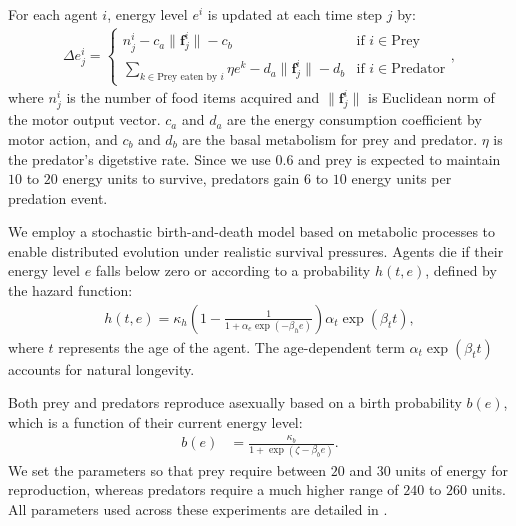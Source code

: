 \documentclass[dvipsnames,format=sigconf]{acmart}
\newcommand{\1}{\mathbb{I} } %
\newcounter{num}
\begin{document}
For each agent $i$, energy level $e^i$ is updated at each time step $j$ by:
\begin{align}
  \Delta{e}_{j}^i =
  \begin{cases}
    n_{j}^{i} - c_{a}\|\bm{f}_{j}^{i}\| - c_{b} & \text{if } i \in \text{Prey} \\
    \sum_{k \in \text{Prey eaten by }i} \eta e^k - d_{a}\|\bm{f}_{j}^{i}\| - d_{b} & \text{if } i \in \text{Predator}
  \end{cases},
  \label{eq:energy}
\end{align}
where $n_{j}^{i}$ is the number of food items acquired and $\|\bm{f}_{j}^{i}\|$ is Euclidean norm of the motor output vector. $c_a$ and $d_a$ are the energy consumption coefficient by motor action, and $c_b$ and $d_b$ are the basal metabolism for prey and predator. $\eta$ is the predator's digetstive rate. Since we use $0.6$ and prey is expected to maintain $10$ to $20$ energy units to survive, predators gain $6$ to $10$ energy units per predation event.

We employ a stochastic birth-and-death model based on metabolic processes to enable distributed evolution under realistic survival pressures. Agents die if their energy level $e$ falls below zero or according to a probability $h(t, e)$, defined by the hazard function:
\begin{align}
  h(t, e) = \kappa_{h}\left(1 - \frac{1}{1 + \alpha_{e}\exp(-\beta_{h}e)}\right)\alpha_{t} \exp(\beta_{t} t),
  \label{eq:h}
\end{align}
where $t$ represents the age of the agent. The age-dependent term $\alpha_{t} \exp(\beta_{t} t)$ accounts for natural longevity.

Both prey and predators reproduce asexually based on a birth probability $b(e)$, which is a function of their current energy level:
\begin{align}
 b(e) &= \frac{\kappa_{b}}{1 + \exp(\zeta - \beta_{b}e)}.
 \label{eq:b}
\end{align}
We set the parameters so that prey require between $20$ and $30$ units of energy for reproduction, whereas predators require a much higher range of $240$ to $260$ units. All parameters used across these experiments are detailed in .
\end{document}
